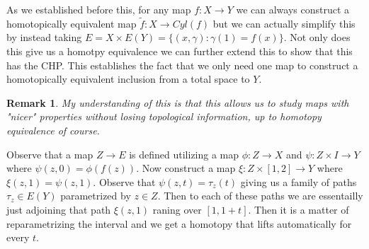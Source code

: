 \documentclass[40pt]{article}
\newtheorem{remark}[theorem]{Remark}
\begin{document}
		As we established before this, for any map $f: X \rightarrow Y$ we can always construct a homotopically equivalent map $\tilde f : X \rightarrow Cyl(f)$ but we can actually simplify this by instead taking $E  = X \times E(Y) = \{(x,\gamma) : \gamma(1) = f(x)\}$. Not only does this give us a homotpy equivalence we can further extend this to show that this has the CHP. This establishes the fact that we only need one map to construct a homotopically equivalent inclusion from a total space to $Y$. 
		\begin{remark}
			My understanding of this is that this allows us to study maps with "nicer" properties without losing topological information, up to homotopy equivalence of course.
		\end{remark}
		Observe that a map $Z \rightarrow E$ is defined utilizing a map $\phi: Z \rightarrow X$ and $\psi : Z \times I \rightarrow Y$ where $\psi(z,0) = \phi(f(z))$. Now construct a map $\xi : Z \times [1,2] \rightarrow Y$ where $\xi(z,1) = \psi(z,1)$. Observe that $\psi(z,t) = \tau_z(t)$ giving us a family of paths $\tau_z \in E(Y)$ parametrized by $z \in Z$. Then to each of these paths we are essentailly just adjoining that path $\xi(z,1)$ raning over $[1,1+t]$. Then it is a matter of reparametrizing the interval and we get a homotopy that lifts automatically for every $t$. 
\end{document}
